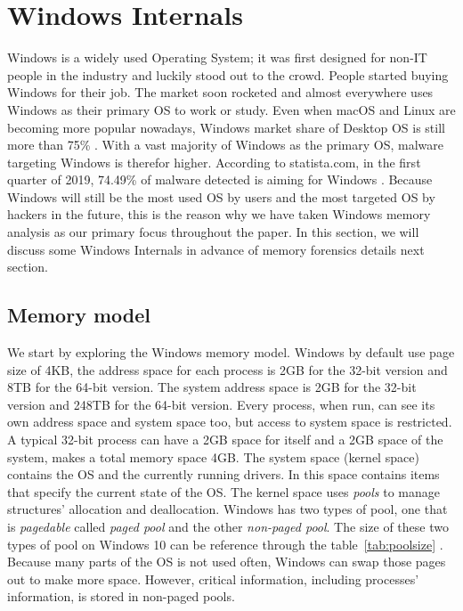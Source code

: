 \section[Windows Internals]{Windows Internals}

Windows is a widely used Operating System; it was first designed for non-IT people in the industry and luckily stood out to the crowd. People started buying Windows for their job. The market soon rocketed and almost everywhere uses Windows as their primary OS to work or study. Even when macOS and Linux are becoming more popular nowadays, Windows market share of Desktop OS is still more than 75\% \cite{windowsStat}. With a vast majority of Windows as the primary OS, malware targeting Windows is therefor higher. According to statista.com, in the first quarter of 2019, 74.49\% of malware detected is aiming for Windows \cite{windowsMalwareStat}. Because Windows will still be the most used OS by users and the most targeted OS by hackers in the future, this is the reason why we have taken Windows memory analysis as our primary focus throughout the paper. In this section, we will discuss some Windows Internals in advance of memory forensics details next section.

\subsection[Memory model]{Memory model}

We start by exploring the Windows memory model. Windows by default use page size of 4KB, the address space for each process is 2GB for the 32-bit version and 8TB for the 64-bit version. The system address space is 2GB for the 32-bit version and 248TB for the 64-bit version. Every process, when run, can see its own address space and system space too, but access to system space is restricted. A typical 32-bit process can have a 2GB space for itself and a 2GB space of the system, makes a total memory space 4GB. The system space (kernel space) contains the OS and the currently running drivers. In this space contains items that specify the current state of the OS. The kernel space uses \textit{pools} to manage structures' allocation and deallocation. Windows has two types of pool, one that is \textit{pagedable} called \textit{paged pool} and the other \textit{non-paged pool}. The size of these two types of pool on Windows 10 can be reference through the table~\ref{tab:poolsize} \cite{memorylimit}. Because many parts of the OS is not used often, Windows can swap those pages out to make more space. However, critical information, including processes' information, is stored in non-paged pools.

